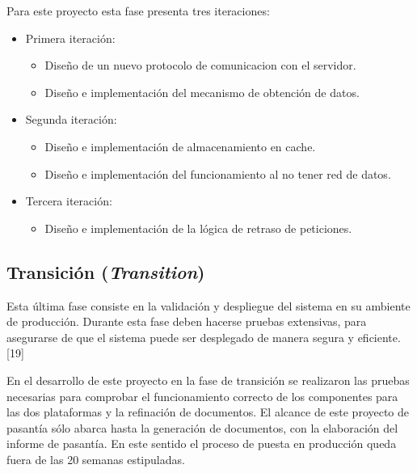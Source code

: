Para este proyecto esta fase presenta tres iteraciones: 
\begin{itemize}
\item Primera iteración:

\begin{itemize}
\item Diseño de un nuevo protocolo de comunicacion con el servidor.
\item Diseño e implementación del mecanismo de obtención de datos.
\end{itemize}
\item Segunda iteración:

\begin{itemize}
\item Diseño e implementación de almacenamiento en cache.
\item Diseño e implementación del funcionamiento al no tener red de datos.
\end{itemize}
\item Tercera iteración:

\begin{itemize}
\item Diseño e implementación de la lógica de retraso de peticiones.
\end{itemize}
\end{itemize}

\subsection{Transición (\textit{Transition})}

Esta última fase consiste en la validación y despliegue del sistema
en su ambiente de producción. Durante esta fase deben hacerse pruebas
extensivas, para asegurarse de que el sistema puede ser desplegado
de manera segura y eficiente. {[}19{]}

En el desarrollo de este proyecto en la fase de transición se realizaron
las pruebas necesarias para comprobar el funcionamiento correcto de
los componentes para las dos plataformas y la refinación de documentos.
El alcance de este proyecto de pasantía sólo abarca hasta la generación
de documentos, con la elaboración del informe de pasantía. En este
sentido el proceso de puesta en producción queda fuera de las 20 semanas
estipuladas. 

\newpage{}
